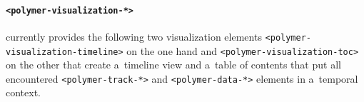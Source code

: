 \paragraph*{\texttt{<polymer-visualization-*>}} currently provides the
    following two visualization elements
    \texttt{<polymer-visualization-timeline>} on the one hand and 
    \texttt{<polymer-visualization-toc>} on the other
    that create a~timeline view and a~table of contents
    that put all encountered \texttt{<polymer-track-*>}
    and \texttt{<polymer-data-*>} elements in a~temporal context.
